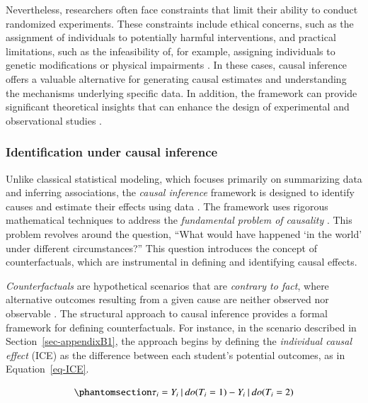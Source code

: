 \documentclass[
  authoryear,
  review,
  1p]{elsarticle}
\begin{document}
Nevertheless, researchers often face constraints that limit their
ability to conduct randomized experiments. These constraints include
ethical concerns, such as the assignment of individuals to potentially
harmful interventions, and practical limitations, such as the
infeasibility of, for example, assigning individuals to genetic
modifications or physical impairments \citep{Neal_2020}. In these cases,
causal inference offers a valuable alternative for generating causal
estimates and understanding the mechanisms underlying specific data. In
addition, the framework can provide significant theoretical insights
that can enhance the design of experimental and observational studies
\citep{McElreath_2020}.

\subsubsection{Identification under causal
inference}\label{sec-appendixB2}

Unlike classical statistical modeling, which focuses primarily on
summarizing data and inferring associations, the \emph{causal inference}
framework is designed to identify causes and estimate their effects
using data \citep{Shaughnessy_et_al_2010, Neal_2020}. The framework uses
rigorous mathematical techniques to address the \emph{fundamental
problem of causality}
\citep{Pearl_2009, Pearl_et_al_2016, Morgan_et_al_2014}. This problem
revolves around the question, ``What would have happened `in the world'
under different circumstances?'' This question introduces the concept of
counterfactuals, which are instrumental in defining and identifying
causal effects.

\emph{Counterfactuals} are hypothetical scenarios that are
\emph{contrary to fact}, where alternative outcomes resulting from a
given cause are neither observed nor observable
\citep{Neal_2020, Counterfactual_2024}. The structural approach to
causal inference \citep{Pearl_2009, Pearl_et_al_2016} provides a formal
framework for defining counterfactuals. For instance, in the scenario
described in Section~\ref{sec-appendixB1}, the approach begins by
defining the \emph{individual causal effect} (ICE) as the difference
between each student's potential outcomes, as in Equation~\ref{eq-ICE}.

\begin{equation}\phantomsection\label{eq-ICE}{
\tau_{i} = Y_{i} \:|\:do(T_{i}=1) - Y_{i} \:|\:do(T_{i}=2)
}\end{equation}
\end{document}

